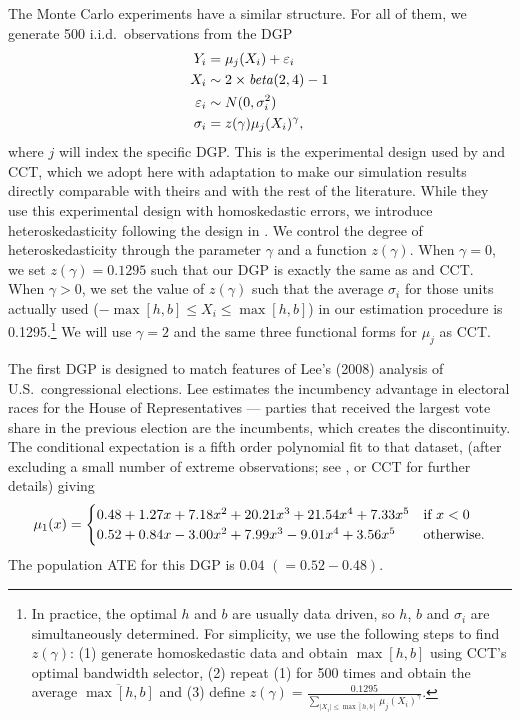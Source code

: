 \documentclass[12pt,fleqn]{article}
\begin{document}
The Monte Carlo experiments have a similar structure. For all of them, we
generate 500 i.i.d.\ observations from the DGP
\begin{align*}
Y_{i}           &= \mu_{j}(X_{i}) + \varepsilon_{i} \\
X_{i}           &\sim  2 \times \operatorname{\mathit{beta}}(2,4) - 1 \\
\varepsilon_{i} &\sim N(0, \sigma_i^2) \\
\sigma_i &= z(\gamma) \mu_{j}(X_{i})^\gamma ,
\end{align*}
where $j$ will index the specific DGP. This is the experimental design used by
\citet{IK} and CCT, which we adopt here with adaptation to make our simulation results directly
comparable with theirs and with the rest of the literature. While they use this experimental design with homoskedastic errors, we introduce heteroskedasticity following the design in \cite{mackinnon2013thirty}. We control the degree of heteroskedasticity through the parameter $\gamma$ and a function $z(\gamma)$. When $\gamma = 0$, we set $z(\gamma) = 0.1295$ such that our DGP is exactly the same as \citet{IK} and CCT. When $\gamma > 0$, we set the value of $z(\gamma)$ such that the average $\sigma_i$ for those units actually used ($-\max[h, b] \le X_i \le \max[h, b]$) in our estimation procedure is 0.1295.\footnote{In practice, the optimal $h$ and $b$ are usually data driven, so $h$, $b$ and $\sigma_i$ are simultaneously determined. For simplicity, we use the following steps to find $z(\gamma)$: (1) generate homoskedastic data and obtain $\max[h, b]$ using CCT's optimal bandwidth selector, (2) repeat (1) for 500 times and obtain the average $\overline{\max[h, b]}$ and (3) define $z(\gamma) = \frac{0.1295}{ \sum_{\lvert X_i \rvert \le \overline{\max[h, b]}} \mu_{j}(X_{i})^\gamma}$.} We will use $\gamma = 2$ and the same three functional forms for $\mu_{j}$ as CCT.

\nocite{lee2008rand}%
The first DGP is designed to match features of Lee's (2008) analysis of U.S.\
congressional elections. Lee estimates the incumbency advantage in electoral
races for the House of Representatives --- parties that received the largest
vote share in the previous election are the incumbents, which creates the
discontinuity. The conditional expectation is a fifth order polynomial fit to
that dataset, (after excluding a small number of extreme observations; see
\citealp{IK}, or CCT for further details) giving
\begin{equation*}
  \mu_{1}(x) =
  \begin{cases}
    0.48 + 1.27x + 7.18x^{2} + 20.21x^{3} + 21.54x^{4} + 7.33x^{5}
    & \text{if}\ x < 0 \\
    0.52 + 0.84x - 3.00x^{2} + 7.99x^3 - 9.01x^4 + 3.56x^{5}
    & \text{otherwise}.
  \end{cases}
\end{equation*}
The population ATE for this DGP is $0.04$ $(= 0.52 - 0.48)$.
\end{document}
